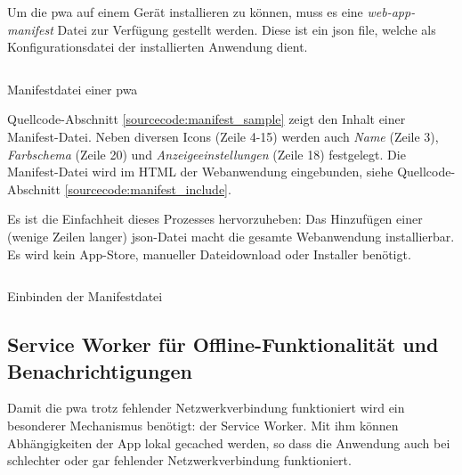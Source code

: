 Um die \ac{pwa} auf einem Gerät installieren zu können, muss es eine \textit{web-app-manifest} Datei zur Verfügung gestellt werden. Diese ist ein \ac{json} file, welche als Konfigurationsdatei der installierten Anwendung dient. \cite{GooglePWAManifest}

\begin{listing}[H]
    \inputminted{json}{sourcecode/manifest_sample.json}
    \caption{Manifestdatei einer \ac{pwa}}
      \label{sourcecode:manifest_sample}
\end{listing}

Quellcode-Abschnitt \ref{sourcecode:manifest_sample} zeigt den Inhalt einer Manifest-Datei. Neben diversen Icons (Zeile 4-15) werden auch \textit{Name} (Zeile 3), \textit{Farbschema} (Zeile 20) und \textit{Anzeigeeinstellungen} (Zeile 18) festgelegt.
Die Manifest-Datei wird im HTML der Webanwendung eingebunden, siehe Quellcode-Abschnitt \ref{sourcecode:manifest_include}. 

Es ist die Einfachheit dieses Prozesses hervorzuheben: Das Hinzufügen einer (wenige Zeilen langer) \ac{json}-Datei macht die gesamte Webanwendung installierbar. Es wird kein App-Store, manueller Dateidownload oder Installer benötigt. 

\begin{listing}[H]
    \inputminted{xml}{sourcecode/include_manifest.html}
    \caption{Einbinden der Manifestdatei}
      \label{sourcecode:manifest_include}
\end{listing}



\subsection{Service Worker für Offline-Funktionalität und Benachrichtigungen}
\label{chap:service_worker}

Damit die \ac{pwa} trotz fehlender Netzwerkverbindung funktioniert wird ein besonderer Mechanismus benötigt: der Service Worker. Mit ihm können Abhängigkeiten der App lokal gecached werden, so dass die Anwendung auch bei schlechter oder gar fehlender Netzwerkverbindung funktioniert. \cite[S. 7]{BeginningPWA}

